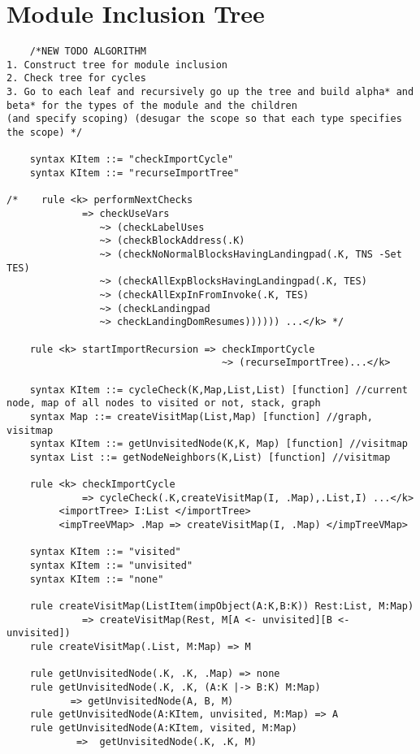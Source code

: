 \section{Module Inclusion Tree}
\begin{lstlisting}
    /*NEW TODO ALGORITHM
1. Construct tree for module inclusion
2. Check tree for cycles
3. Go to each leaf and recursively go up the tree and build alpha* and beta* for the types of the module and the children
(and specify scoping) (desugar the scope so that each type specifies the scope) */

    syntax KItem ::= "checkImportCycle"
    syntax KItem ::= "recurseImportTree"

/*    rule <k> performNextChecks
             => checkUseVars
                ~> (checkLabelUses
                ~> (checkBlockAddress(.K)
                ~> (checkNoNormalBlocksHavingLandingpad(.K, TNS -Set TES)
                ~> (checkAllExpBlocksHavingLandingpad(.K, TES)
                ~> (checkAllExpInFromInvoke(.K, TES)
                ~> (checkLandingpad
                ~> checkLandingDomResumes)))))) ...</k> */

    rule <k> startImportRecursion => checkImportCycle 
                                     ~> (recurseImportTree)...</k>

    syntax KItem ::= cycleCheck(K,Map,List,List) [function] //current node, map of all nodes to visited or not, stack, graph
    syntax Map ::= createVisitMap(List,Map) [function] //graph, visitmap
    syntax KItem ::= getUnvisitedNode(K,K, Map) [function] //visitmap
    syntax List ::= getNodeNeighbors(K,List) [function] //visitmap

    rule <k> checkImportCycle
             => cycleCheck(.K,createVisitMap(I, .Map),.List,I) ...</k>
         <importTree> I:List </importTree>
         <impTreeVMap> .Map => createVisitMap(I, .Map) </impTreeVMap>

    syntax KItem ::= "visited"
    syntax KItem ::= "unvisited"
    syntax KItem ::= "none"

    rule createVisitMap(ListItem(impObject(A:K,B:K)) Rest:List, M:Map) 
             => createVisitMap(Rest, M[A <- unvisited][B <- unvisited])
    rule createVisitMap(.List, M:Map) => M

    rule getUnvisitedNode(.K, .K, .Map) => none
    rule getUnvisitedNode(.K, .K, (A:K |-> B:K) M:Map)
           => getUnvisitedNode(A, B, M)
    rule getUnvisitedNode(A:KItem, unvisited, M:Map) => A
    rule getUnvisitedNode(A:KItem, visited, M:Map)
            =>  getUnvisitedNode(.K, .K, M)




\end{lstlisting}
